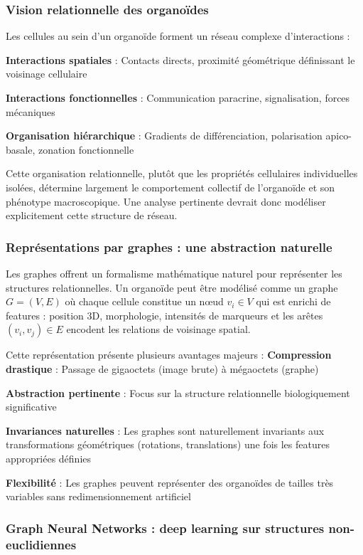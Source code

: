 \subsubsection{Vision relationnelle des organoïdes}

Les cellules au sein d'un organoïde forment un réseau complexe d'interactions :

\textbf{Interactions spatiales} : Contacts directs, proximité géométrique définissant le voisinage cellulaire

\textbf{Interactions fonctionnelles} : Communication paracrine, signalisation, forces mécaniques

\textbf{Organisation hiérarchique} : Gradients de différenciation, polarisation apico-basale, zonation fonctionnelle

Cette organisation relationnelle, plutôt que les propriétés cellulaires individuelles isolées, détermine largement le comportement collectif de l'organoïde et son phénotype macroscopique. Une analyse pertinente devrait donc modéliser explicitement cette structure de réseau.

\subsubsection{Représentations par graphes : une abstraction naturelle}

Les graphes offrent un formalisme mathématique naturel pour représenter les structures relationnelles. Un organoïde peut être modélisé comme un graphe $G = (V, E)$ où chaque cellule constitue un nœud $v_i \in V$ qui est enrichi de features : position 3D, morphologie, intensités de marqueurs et les arêtes $(v_i, v_j) \in E$ encodent les relations de voisinage spatial.

Cette représentation présente plusieurs avantages majeurs :
\textbf{Compression drastique} : Passage de gigaoctets (image brute) à mégaoctets (graphe)

\textbf{Abstraction pertinente} : Focus sur la structure relationnelle biologiquement significative

\textbf{Invariances naturelles} : Les graphes sont naturellement invariants aux transformations géométriques (rotations, translations) une fois les features appropriées définies

\textbf{Flexibilité} : Les graphes peuvent représenter des organoïdes de tailles très variables sans redimensionnement artificiel

\subsubsection{Graph Neural Networks : deep learning sur structures non-euclidiennes}

